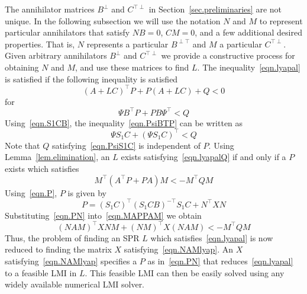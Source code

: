 \documentclass[]{../sty/aiaa-tc}
\begin{document}
  The annihilator matrices $B^{\perp}$ and $C^{\top\perp}$ in Section~\ref{sec.preliminaries} are not unique.
  In the following subsection we will use the notation $N$ and $M$ to represent particular annihilators that satisfy $NB=0$, $CM=0$, and a few additional desired properties.
  That is, $N$ represents a particular $B^{\perp\top}$ and $M$ a particular $C^{\top\perp}$.
  Given arbitrary annihilators $B^{\perp}$ and $C^{\top\perp}$ we provide a constructive process for obtaining $N$ and $M$, and use these matrices to find $L$.
  The inequality\ \eqref{eqn.lyapal} is satisfied if the following inequality is satisfied
  \begin{equation}
    \label{eqn.lyapalQ}
    (A+LC)^{\top}P+P(A+LC)+Q<0
  \end{equation}
  for
  \begin{equation}
    \label{eqn.PsiBTP}
    \Psi B^{\top}P+PB\Psi^{\top}<Q
  \end{equation}
  Using\ \eqref{eqn.S1CB}, the inequality\ \eqref{eqn.PsiBTP} can be written as
  \begin{equation}
    \label{eqn.PsiS1C}
    \Psi S_{1}C+(\Psi S_{1}C)^{\top}<Q
  \end{equation}
  Note that $Q$ satisfying\ \eqref{eqn.PsiS1C} is independent of $P$.
  Using Lemma~\ref{lem.elimination}, an $L$ exists satisfying\ \eqref{eqn.lyapalQ} if and only if a $P$ exists which satisfies
  \begin{equation}
    \label{eqn.MAPPAM}
    M^{\top}(A^{\top}P+PA)M<-M^{\top}QM
  \end{equation}
  Using\ \eqref{eqn.P}, $P$ is given by
  \begin{equation}
    \label{eqn.PN}
    P=(S_{1}C)^{\top}(S_{1}CB)^{-\top}S_{1}C+N^{\top}XN
  \end{equation}
  Substituting\ \eqref{eqn.PN} into\ \eqref{eqn.MAPPAM} we obtain
  \begin{equation}
    \label{eqn.NAMlyap}
    (NAM)^{\top}XNM+(NM)^{\top}X(NAM)<-M^{\top}QM
  \end{equation}
  Thus, the problem of finding an SPR $L$ which satisfies\ \eqref{eqn.lyapal} is now reduced to finding the matrix $X$ satisfying\ \eqref{eqn.NAMlyap}.
  An $X$ satisfying\ \eqref{eqn.NAMlyap} specifies a $P$ as in\ \eqref{eqn.PN} that reduces\ \eqref{eqn.lyapal} to a feasible LMI in $L$.
  This feasible LMI can then be easily solved using any widely available numerical LMI solver.
\end{document}

